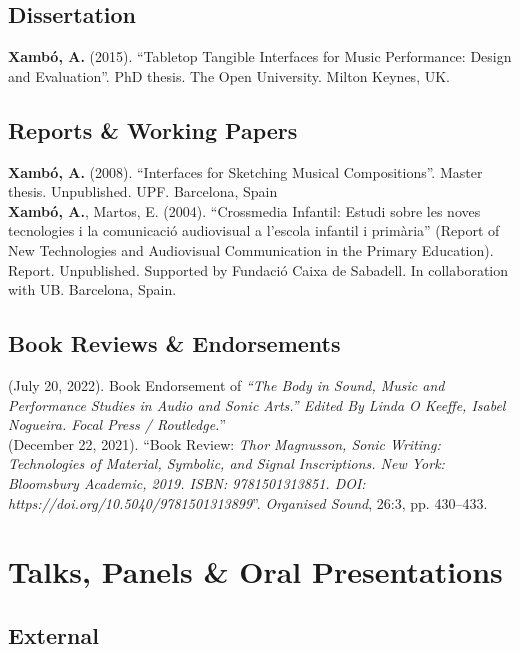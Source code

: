 \documentclass[10pt, a4paper]{article}
\newcommand{\years}[1]{\marginnote{\scriptsize #1}}
\begin{document}
{\subsection*{Dissertation}
\noindent

\years{2015}\textbf{Xambó, A.} (2015). ``Tabletop Tangible Interfaces for Music Performance: Design and Evaluation''. PhD thesis. The Open University. Milton Keynes, UK.

\subsection*{Reports \& Working Papers}
\noindent

\years{2008}\textbf{Xambó, A.} (2008). ``Interfaces for Sketching Musical Compositions''. Master thesis. Unpublished. UPF. Barcelona, Spain\\ 
\years{2004}\textbf{Xambó, A.}, Martos, E. (2004). ``Crossmedia Infantil: Estudi sobre les noves tecnologies i la comunicació audiovisual a l'escola infantil i primària'' (Report of New Technologies and Audiovisual Communication in the Primary Education). Report. Unpublished. Supported by Fundació Caixa de Sabadell. In collaboration with UB. Barcelona, Spain.

\subsection*{Book Reviews \& Endorsements}
\noindent

\years{2022}(July 20, 2022). Book Endorsement of \emph{``The Body in Sound, Music and Performance Studies in Audio and Sonic Arts.'' Edited By Linda O Keeffe, Isabel Nogueira. Focal Press / Routledge.}''\\
\years{2021}(December 22, 2021). ``Book Review: \emph{Thor Magnusson, Sonic Writing: Technologies of Material, Symbolic, and Signal Inscriptions. New York: Bloomsbury Academic, 2019. ISBN: 9781501313851. DOI: https://doi.org/10.5040/9781501313899}''. \emph{Organised Sound}, 26:3, pp. 430–433.


\section*{Talks, Panels \& Oral Presentations}

\subsection*{External}
\noindent

}
\end{document}
